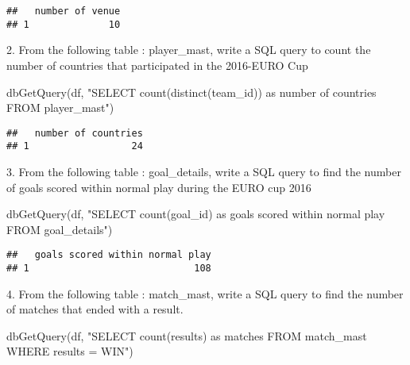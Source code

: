 \documentclass[
]{article}
\newenvironment{Shaded}{\begin{snugshade}}{\end{snugshade}}
\newcommand{\FunctionTok}[1]{\textcolor[rgb]{0.00,0.00,0.00}{#1}}
\newcommand{\NormalTok}[1]{#1}
\newcommand{\StringTok}[1]{\textcolor[rgb]{0.31,0.60,0.02}{#1}}
\begin{document}
\begin{verbatim}
##   number of venue
## 1              10
\end{verbatim}

2. From the following table : player\_mast, write a SQL query to count
the number of countries that participated in the 2016-EURO Cup

\begin{Shaded}
\begin{Highlighting}[]
\FunctionTok{dbGetQuery}\NormalTok{(df, }\StringTok{"SELECT count(distinct(team\_id)) as \textquotesingle{}number of countries\textquotesingle{}}
\StringTok{                FROM player\_mast"}\NormalTok{)}
\end{Highlighting}
\end{Shaded}

\begin{verbatim}
##   number of countries
## 1                  24
\end{verbatim}

3. From the following table : goal\_details, write a SQL query to find
the number of goals scored within normal play during the EURO cup 2016

\begin{Shaded}
\begin{Highlighting}[]
\FunctionTok{dbGetQuery}\NormalTok{(df, }\StringTok{"SELECT count(goal\_id) as \textquotesingle{}goals scored within normal play\textquotesingle{}}
\StringTok{                FROM goal\_details"}\NormalTok{)}
\end{Highlighting}
\end{Shaded}

\begin{verbatim}
##   goals scored within normal play
## 1                             108
\end{verbatim}

4. From the following table : match\_mast, write a SQL query to find the
number of matches that ended with a result.

\begin{Shaded}
\begin{Highlighting}[]
\FunctionTok{dbGetQuery}\NormalTok{(df, }\StringTok{"SELECT count(results) as \textquotesingle{}matches\textquotesingle{}}
\StringTok{                FROM match\_mast}
\StringTok{                WHERE results = \textquotesingle{}WIN\textquotesingle{}"}\NormalTok{)}
\end{Highlighting}
\end{Shaded}
\end{document}
